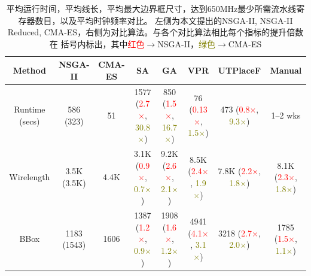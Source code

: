 \begin{table}[h]
    
    \caption{平均运行时间，平均线长，平均最大边界框尺寸，达到650MHz最少所需流水线寄存器数目，以及平均时钟频率对比。
    左侧为本文提出的NSGA-II, NSGA-II Reduced, CMA-ES，右侧为对比算法。与各个对比算法相比每个指标的提升倍数在
    括号内标出，其中\textcolor{red}{红色}$\rightarrow$NSGA-II，\textcolor{olive}{绿色}$\rightarrow$CMA-ES}
	\label{table:comparison}
  \centering
  \begin{adjustbox}{width=1.1\textwidth,center}
  \begin{tabular}{c|c c| c c c c c}
	\toprule
  Method             & NSGA-II    	          & CMA-ES       & SA 					                                                                       & GA 			                                                                  & VPR     	                                                                & UTPlaceF 		                                                                   &  Manual \\
	\midrule
  Runtime (secs)     & 586 (323)		          & 51  		     &1577     (\textcolor{red}{2.7$\times$}, \textcolor{olive}{30.8$\times$})		        & 850 (\textcolor{red}{1.5$\times$}, \textcolor{olive}{16.7$\times$})		      & 76 (\textcolor{red}{0.13$\times$}, \textcolor{olive}{1.5$\times$})		    &  473 (\textcolor{red}{0.8$\times$}, \textcolor{olive}{9.3$\times$})            & 1--2 wks\\
  Wirelength  	     & 3.5K  (3.5K)   		    & 4.4K     		 &3.1K 	   (\textcolor{red}{0.9$\times$}, \textcolor{olive}{0.7$\times$})		          & 9.2K  (\textcolor{red}{2.6$\times$}, \textcolor{olive}{2.1$\times$})    		& 8.5K (\textcolor{red}{2.4$\times$}, \textcolor{olive}{1.9$\times$})   		&  7.8K  (\textcolor{red}{2.2$\times$}, \textcolor{olive}{1.8$\times$})          & 8.1K (\textcolor{red}{2.3$\times$}, \textcolor{olive}{1.8$\times$})  \\
  BBox      	       & 1183  (1543)   		    & 1606     		 &1387	   (\textcolor{red}{1.2$\times$}, \textcolor{olive}{0.9$\times$})		          & 1908  (\textcolor{red}{1.6$\times$}, \textcolor{olive}{1.2$\times$})   		  & 4941	(\textcolor{red}{4.1$\times$}, \textcolor{olive}{3.1$\times$})  		&   3218	(\textcolor{red}{2.7$\times$}, \textcolor{olive}{2.0$\times$})         & 1785 (\textcolor{red}{1.5$\times$}, \textcolor{olive}{1.1$\times$})  \\

\end{tabular}
\end{adjustbox}
\end{table}
